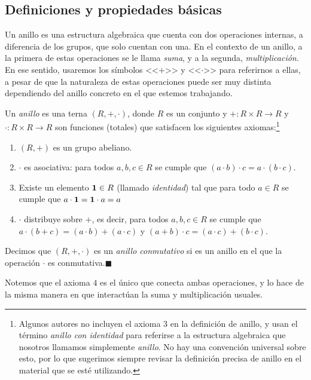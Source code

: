 \subsection{Definiciones y propiedades básicas}

Un anillo es una estructura algebraica que cuenta con dos operaciones internas, a diferencia de los grupos, que solo cuentan con una. En el contexto de un anillo, a la primera de estas operaciones se le llama \emph{suma}, y a la segunda, \emph{multiplicación}. En ese sentido, usaremos los símbolos <<$+$>> y <<$\cdot$>> para referirnos a ellas, a pesar de que la naturaleza de estas operaciones puede ser muy distinta dependiendo del anillo concreto en el que estemos trabajando.

\begin{definition}
    Un \emph{anillo} es una terna $(R, +, \cdot)$, donde $R$ es un conjunto y $+ \colon R \times R \to R$ y $\cdot \colon R \times R \to R$ son funciones (totales) que satisfacen los siguientes axiomas:\footnote{Algunos autores 
    no incluyen el axioma $3$ en la definición de anillo, y usan el término \emph{anillo con identidad} para referirse a la estructura algebraica que nosotros llamamos simplemente \emph{anillo}. No hay una convención universal sobre esto, por lo que sugerimos siempre revisar la definición precisa de anillo en el material que se esté utilizando.}
    \begin{enumerate}
        \item $(R, +)$ es un grupo abeliano.
        \item $\cdot$ es asociativa: para todos $a,b,c \in R$ se cumple que $(a \cdot b) \cdot c = a \cdot (b
\cdot c)$.

	\item Existe un elemento $\mathbf{1} \in R$ (llamado \emph{identidad}) tal que para todo $a \in R$ se cumple que $a \cdot \mathbf{1} = \mathbf{1} \cdot a = a$

   \item $\cdot$ distribuye sobre $+$, es decir, para todos $a, b, c \in R$ se cumple que $a \cdot (b + c) = (a \cdot b) + (a \cdot c)$ y $(a+b) \cdot c = (a \cdot c ) + (b \cdot c).$
    \end{enumerate}
    Decimos que $(R, +, \cdot)$ es un \emph{anillo conmutativo} si es un anillo en el que la operación $\cdot$ es conmutativa.\hfill$\blacksquare$
    \end{definition}

Notemos que el axioma $4$ es el único que conecta ambas operaciones, y lo hace de la misma manera en que interactúan la suma y multiplicación usuales.

